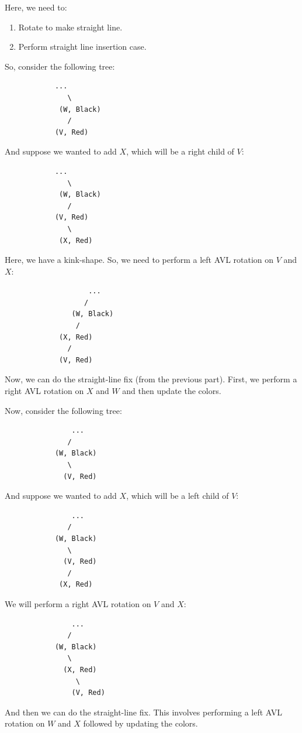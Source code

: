 \documentclass[letterpaper]{article}
\begin{document}
\begin{itemize}
\begin{itemize}
        Here, we need to: 
        \begin{enumerate}
            \item Rotate to make straight line. 
            \item Perform straight line insertion case. 
        \end{enumerate}
        So, consider the following tree: 
        \begin{verbatim}
            ...
               \ 
             (W, Black)
               / 
            (V, Red)
        \end{verbatim}
        And suppose we wanted to add $X$, which will be a right child of $V$: 
        \begin{verbatim}
            ...
               \ 
             (W, Black)
               / 
            (V, Red)
               \ 
             (X, Red)
        \end{verbatim}
        Here, we have a kink-shape. So, we need to perform a left AVL rotation on $V$ and $X$: 
        \begin{verbatim}
                    ... 
                   /
                (W, Black)
                 / 
             (X, Red)
               /
             (V, Red)
        \end{verbatim}
        Now, we can do the straight-line fix (from the previous part). First, we perform a right AVL rotation on $X$ and $W$ and then update the colors. 
        
        \bigskip 

        Now, consider the following tree: 
        \begin{verbatim}
                ...
               / 
            (W, Black)
               \ 
              (V, Red)
        \end{verbatim}
        And suppose we wanted to add $X$, which will be a left child of $V$: 
        \begin{verbatim}
                ...
               / 
            (W, Black)
               \ 
              (V, Red)
               /
             (X, Red)
        \end{verbatim}
        We will perform a right AVL rotation on $V$ and $X$: 
        \begin{verbatim}
                ...
               / 
            (W, Black)
               \ 
              (X, Red)
                 \ 
                (V, Red)
        \end{verbatim}
        And then we can do the straight-line fix. This involves performing a left AVL rotation on $W$ and $X$ followed by updating the colors.

    \end{itemize}
\end{itemize}
\end{document}
